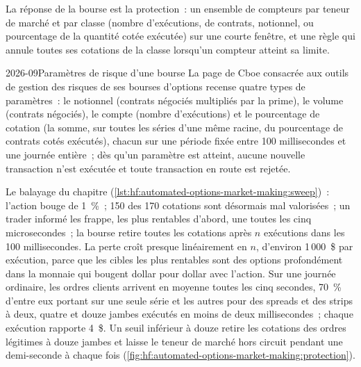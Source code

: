 La réponse de la bourse est la protection~: un ensemble de compteurs par teneur de marché et par classe (nombre d'exécutions, de contrats, notionnel, ou pourcentage
de la quantité cotée exécutée) sur une courte fenêtre, et une règle qui annule toutes ses cotations de la classe lorsqu'un compteur atteint sa limite.

\begin{dated}{2026-09}{Paramètres de risque d'une bourse}\label{dat:hf:automated-options-market-making:cboe}
La page de Cboe consacrée aux outils de gestion des risques de ses bourses d'options recense quatre types de paramètres~: le notionnel (contrats négociés multipliés par la prime), le volume (contrats
négociés), le compte (nombre d'exécutions) et le pourcentage de cotation (la somme, sur toutes les séries d'une même racine, du pourcentage de contrats cotés
exécutés), chacun sur une période fixée entre 100 millisecondes et une journée entière~; dès qu'un paramètre est atteint, aucune nouvelle transaction n'est exécutée et toute
transaction en route est rejetée.
\end{dated}

Le balayage du chapitre (\cref{lst:hf:automated-options-market-making:sweep})~: l'action bouge de 1~\%~; 150 des 170 cotations sont désormais mal valorisées~; un trader
informé les frappe, les plus rentables d'abord, une toutes les cinq microsecondes~; la bourse retire toutes les cotations après $n$ exécutions dans les 100 millisecondes.
La perte croît presque linéairement en $n$, d'environ 1\,000~\$ par exécution, parce que les cibles les plus rentables sont des options profondément dans la monnaie qui bougent
dollar pour dollar avec l'action. Sur une journée ordinaire, les ordres clients arrivent en moyenne toutes les cinq secondes, 70~\% d'entre eux portant sur une seule série et les autres
pour des spreads et des strips à deux, quatre et douze jambes exécutés en moins de deux millisecondes~; chaque exécution rapporte 4~\$. Un seuil inférieur à douze retire les
cotations des ordres légitimes à douze jambes et laisse le teneur de marché hors circuit pendant une demi-seconde à chaque fois
(\cref{fig:hf:automated-options-market-making:protection}).

